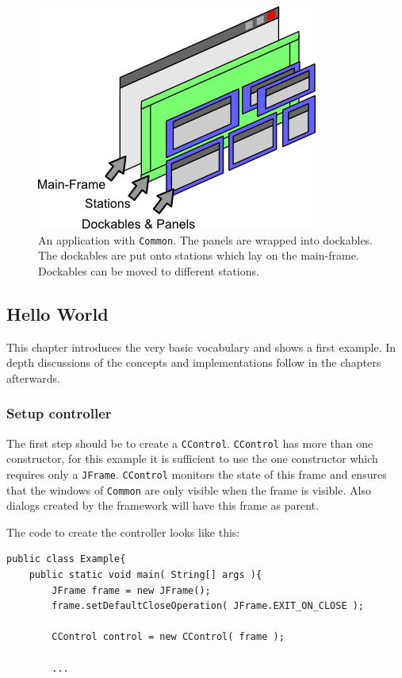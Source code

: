 \documentclass[a4paper,10pt]{article}
\newcommand{\src}[1]{\texttt{#1}}
\begin{document}
\begin{figure}[ht]
\centering
\includegraphics[scale=1]{app_with}
\caption{An application with \src{Common}. The panels are wrapped into dockables. The dockables are put onto stations which lay on the main-frame. Dockables can be moved to different stations.}
\label{fig:app_with}
\end{figure}

\subsection{Hello World}
This chapter introduces the very basic vocabulary and shows a first example. In depth discussions of the concepts and implementations follow in the chapters afterwards.

\subsubsection{Setup controller}
The first step should be to create a \src{CControl}. \src{CControl} has more than one constructor, for this example it is sufficient to use the one constructor which requires only a \src{JFrame}. \src{CControl} monitors the state of this frame and ensures that the windows of \src{Common} are only visible when the frame is visible. Also dialogs created by the framework will have this frame as parent.

The code to create the controller looks like this:
\begin{lstlisting}
public class Example{
	public static void main( String[] args ){
		JFrame frame = new JFrame();
		frame.setDefaultCloseOperation( JFrame.EXIT_ON_CLOSE );
		
		CControl control = new CControl( frame );
		
		...
\end{lstlisting}
\end{document}
